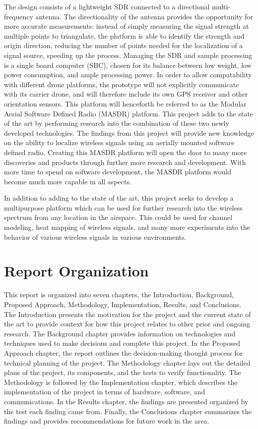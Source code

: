 The design consists of a lightweight SDR connected to a directional multi-frequency antenna. The directionality of the antenna provides the opportunity for more accurate measurements: instead of simply measuring the signal strength at multiple points to triangulate, the platform is able to identify the strength and origin direction, reducing the number of points needed for the localization of a signal source, speeding up the process. Managing the SDR and sample processing is a single board computer (SBC), chosen for its balance between low weight, low power consumption, and ample processing power. In order to allow compatability with different drone platforms, the prototype will not explicitly communicate with its carrier drone, and will therefore include its own GPS receiver and other orientation sensors. This platform will henceforth be referred to as the Modular Aerial Software Defined Radio (MASDR) platform. This project adds to the state of the art by performing research into the combination of these two newly developed technologies. The findings from this project will provide new knowledge on the ability to localize wireless signals using an aerially mounted software defined radio. Creating this MASDR platform will open the door to many more discoveries and products through further more research and development. With more time to spend on software development, the MASDR platform would become much more capable in all aspects.\par
In addition to adding to the state of the art, this project seeks to develop a multipurpose platform which can be used for further research into the wireless spectrum from any location in the airspace. This could be used for channel modeling, heat mapping of wireless signals, and many more experiments into the behavior of various wireless signals in various environments.\par
\section{Report Organization}
This report is organized into seven chapters, the Introduction, Background, Proposed Approach, Methodology, Implementation, Results, and Conclusions. The Introduction presents the motivation for the project and the current state of the art to provide context for how this project relates to other prior and ongoing research. The Background chapter provides information on technologies and techniques used to make decisions and complete this project. In the Proposed Approach chapter, the report outlines the decision-making thought process for technical planning of the project. The Methodology chapter lays out the detailed plans of the project, its components, and the tests to verify functionality. The Methodology is followed by the Implementation chapter, which describes the implementation of the project in terms of hardware, software, and communications. In the Results chapter, the findings are presented organized by the test each finding came from. Finally, the Conclusions chapter summarizes the findings and provides recommendations for future work in the area.\par